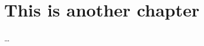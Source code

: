 
\chapter{This is another chapter} %



\ifpdf
    \graphicspath{{7/figures/PNG/}{7/figures/PDF/}{7/figures/}}
\else
    \graphicspath{{7/figures/EPS/}{7/figures/}}
\fi


% 

\dots



